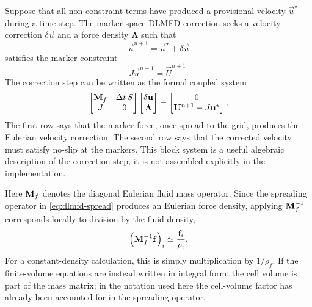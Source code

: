 Suppose that all non-constraint terms have produced a provisional velocity
\(\vec u^\star\) during a time step. The marker-space DLMFD correction seeks a
velocity correction \(\delta\vec u\) and a force density \(\bm\Lambda\) such
that
\begin{equation}
    \vec u^{n+1}
    = \vec u^\star + \delta\vec u
    \label{eq:dlmfd-velocity-correction}
\end{equation}
satisfies the marker constraint
\begin{equation}
    J\vec u^{n+1} = \vec U^{n+1}.
    \label{eq:dlmfd-discrete-constraint}
\end{equation}
The correction step can be written as the formal coupled system
\begin{equation}
    \begin{bmatrix}
        \mathbf{M}_f & \Delta t\,S \\
        J        & 0
    \end{bmatrix}
    \begin{bmatrix}
        \delta\mathbf{u} \\
        \bm\Lambda
    \end{bmatrix}
    =
    \begin{bmatrix}
        0 \\
        \mathbf{U}^{n+1}-J\mathbf{u}^\star
    \end{bmatrix}.
    \label{eq:dlmfd-coupled-correction-system}
\end{equation}
The first row says that the marker force, once spread to the grid, produces the
Eulerian velocity correction. The second row says that the corrected velocity
must satisfy no-slip at the markers. This block system is a useful algebraic
description of the correction step; it is not assembled explicitly in the
implementation.

Here \(\mathbf{M}_f\) denotes the diagonal Eulerian fluid mass operator. Since the
spreading operator in \eqref{eq:dlmfd-spread} produces an Eulerian force
density, applying \(\mathbf{M}_f^{-1}\) corresponds locally to division by the
fluid density,
\begin{equation}
    \left(\mathbf{M}_f^{-1}\mathbf{f}\right)_i
    \simeq \frac{\mathbf{f}_i}{\rho_i}.
    \label{eq:dlmfd-fluid-mass-inverse}
\end{equation}
For a constant-density calculation, this is simply multiplication by
\(1/\rho_f\). If the finite-volume equations are instead written in integral
form, the cell volume is part of the mass matrix; in the notation used here the
cell-volume factor has already been accounted for in the spreading operator.

